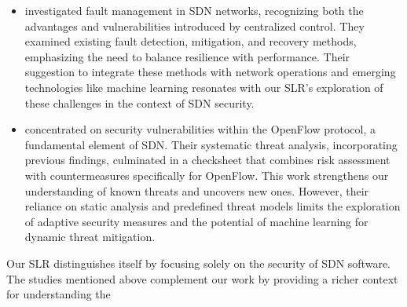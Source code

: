 \begin{itemize}
    \item \textbf{\cite{7959044}} investigated fault management in SDN networks, recognizing both the advantages and vulnerabilities introduced by centralized control. They examined existing fault detection, mitigation, and recovery methods, emphasizing the need to balance resilience with performance. Their suggestion to integrate these methods with network operations and emerging technologies like machine learning resonates with our SLR's exploration of these challenges in the context of SDN security.
    
    \item \textbf{\cite{10.1007/978-3-319-49106-6_22}} concentrated on security vulnerabilities within the OpenFlow protocol, a fundamental element of SDN. Their systematic threat analysis, incorporating previous findings, culminated in a checksheet that combines risk assessment with countermeasures specifically for OpenFlow. This work strengthens our understanding of known threats and uncovers new ones. However, their reliance on static analysis and predefined threat models limits the exploration of adaptive security measures and the potential of machine learning for dynamic threat mitigation.
\end{itemize}
Our SLR distinguishes itself by focusing solely on the security of SDN software. The studies mentioned above complement our work by providing a richer context for understanding the